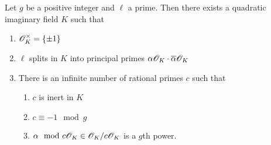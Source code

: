 \documentclass{amsart}
\begin{document}
\begin{lemma}\label{lem:K-exists}
  Let $g$ be a positive integer and $\ell$ a prime. Then there exists a quadratic imaginary field $K$ such that
  \begin{enumerate}
    \item $\mathscr{O}_K^\times = \{\pm 1\}$
    \item $\ell$ splits in $K$ into principal primes $\alpha\mathscr{O}_K \cdot \overline{\alpha}\mathscr{O}_K$
    \item There is an infinite number of rational primes $c$ such that
    \begin{enumerate}
      \item $c$ is inert in $K$
      \item $c \equiv -1 \mod{g}$
      \item $\alpha \mod c\mathscr{O}_K \in \mathscr{O}_K/c\mathscr{O}_K$ is a $g$th power.
    \end{enumerate}
  \end{enumerate}
\end{lemma}
\end{document}
